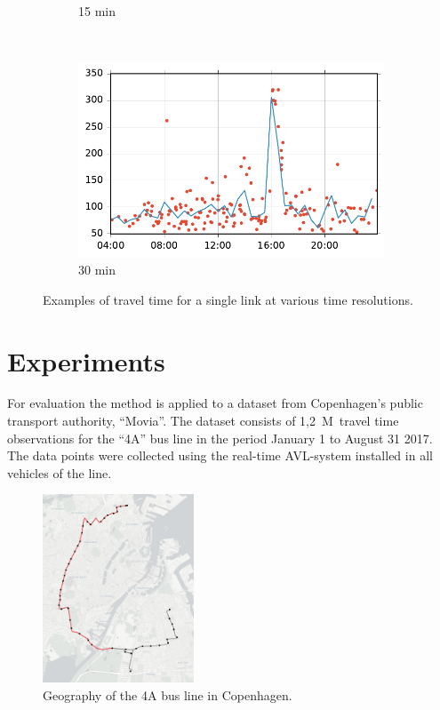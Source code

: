 \documentclass[preprint,11pt,5p,twocolumn]{elsarticle}
\begin{document}
\begin{figure}[!t]
\begin{subfigure}[t]{0.31\textwidth}
        \caption{15 min}
    \end{subfigure}
    ~
    \begin{subfigure}[t]{0.31\textwidth}
        \centering
        \includegraphics[width=\textwidth]{plots/decycle_30min.pdf}
        \caption{30 min}
    \end{subfigure}

    \caption{Examples of travel time for a single link at various time resolutions.}
    \label{fig:resolutions}
\end{figure}
\newpage

\section{Experiments}
\label{sec:experiments}

For evaluation the method is applied to a dataset from Copenhagen's public transport authority, ``Movia''. The dataset consists of 1,2~M~travel time observations for the ``4A'' bus line in the period January 1 to August 31 2017. The data points were collected using the real-time AVL-system installed in all vehicles of the line. 

\begin{figure}[!ht]
  \centering
  \includegraphics[width=0.4\textwidth]{drawings/map.png}
  \caption{Geography of the 4A bus line in Copenhagen.}
  \label{fig:4a_map}
\end{figure}
\end{document}
